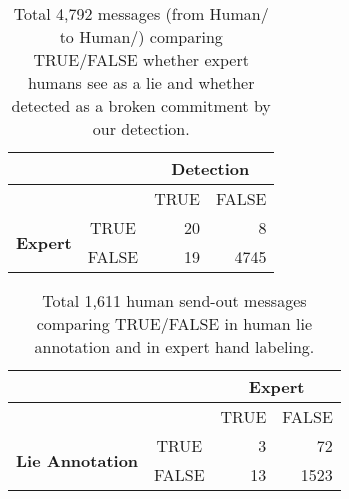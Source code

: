 \begin{table}
\centering
\begin{tabular}{ccrr}
\hline
& &\multicolumn{2}{c}{\textbf{Detection}} \\
\hline
& & TRUE & FALSE \\
\hline
\multirow{2}{*}{\textbf{Expert}} & TRUE &20 &8 \\
&FALSE &19 & 4745 \\
\hline
\end{tabular}
\caption{Total 4,792 messages (from Human/\cicero{} to Human/\cicero{}) comparing TRUE/FALSE whether expert humans see as a lie and whether detected as a broken commitment by our detection.}
\label{tab:expert_detect}
\end{table}


\begin{table}
\centering
\begin{tabular}{ccrr}
\hline
& &\multicolumn{2}{c}{\textbf{Expert}} \\
\hline
& & TRUE & FALSE \\
\hline
\multirow{ 2}{*}{\textbf{Lie Annotation}} & TRUE &3 &72 \\
&FALSE &13 & 1523 \\
\hline
\end{tabular}
\caption{Total 1,611 human send-out messages comparing TRUE/FALSE in human lie annotation and in expert hand labeling.}
\label{tab:ann_expert}
\end{table}


